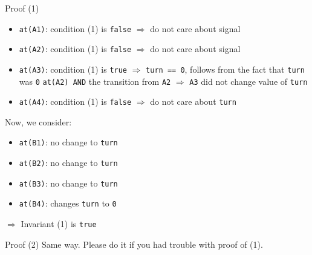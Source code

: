 \begin{frame}{Proof (1)}
  \begin{itemize}
  \item \lstinline!at(A1)!: condition (1) is \lstinline!false!
    $\Rightarrow$ do not care about signal
  \item \lstinline!at(A2)!: condition (1) is \lstinline!false!
    $\Rightarrow$ do not care about signal
  \item \lstinline!at(A3)!: condition (1) is \lstinline!true!
    $\Rightarrow$ \lstinline!turn == 0!, follows from the fact that
    \lstinline!turn!  was \lstinline!0! \lstinline!at(A2) AND! the
    transition from \lstinline!A2! $\Rightarrow$ \lstinline!A3! did
    not change value of \lstinline!turn!
  \item \lstinline!at(A4)!: condition (1) is \lstinline!false!
    $\Rightarrow$ do not care about \lstinline!turn!
  \end{itemize}

  Now, we consider:

  \begin{itemize}
  \item \lstinline!at(B1)!: no change to \lstinline!turn!
  \item \lstinline!at(B2)!: no change to \lstinline!turn!
  \item \lstinline!at(B3)!: no change to \lstinline!turn!
  \item \lstinline!at(B4)!: changes \lstinline!turn! to \lstinline!0!
  \end{itemize}
  $\Rightarrow$ Invariant (1) is \lstinline!true!
\end{frame}

\begin{frame}{Proof (2)}
  Same way. Please do it if you had trouble with proof of (1).
\end{frame}

